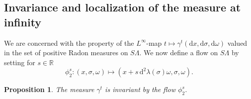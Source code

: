 \documentclass[10pt]{amsart}
\newtheorem{prop}[cdrthm]{Proposition}
\theoremstyle{definition}
\newcommand*\R{{\mathbb R}}
\numberwithin{equation}{section}
\newcommand*{\dd}{\mathrm{d}}
\newcommand*{\dx}{\dd x}
\newcommand*{\dsigma}{\dd \sigma}
\newcommand*{\domega}{\dd \omega}
\begin{document}
\subsection{Invariance and localization of the measure at infinity}

We are concerned with the property of the $L^\infty$-map $t\mapsto \gamma^t(\dx,\dsigma,\domega)$ valued in the set of positive Radon measures on $S\Lambda$. We now define a flow on $S \Lambda$ by setting for $s\in\R$
\[
\phi^s_2 : (x,\sigma,\omega)\mapsto (x+s \,\dd^2\lambda(\sigma) \omega,\sigma,\omega).
\]

\goodbreak
\begin{prop}\label{prop:inv2micro}
The measure $\gamma^t$ is invariant by the flow $\phi^s_2$.
\end{prop}
\end{document}
